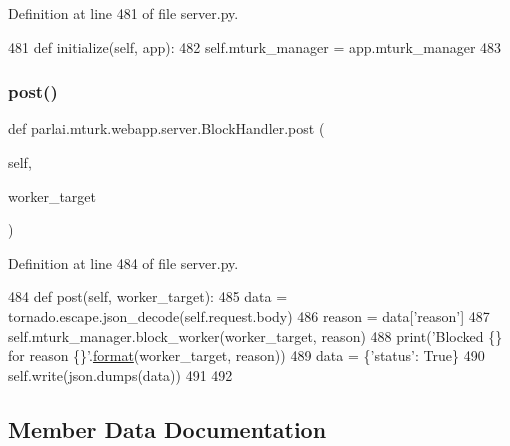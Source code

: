 Definition at line 481 of file server.\+py.


\begin{DoxyCode}
481     \textcolor{keyword}{def }initialize(self, app):
482         self.mturk\_manager = app.mturk\_manager
483 
\end{DoxyCode}
\mbox{\label{classparlai_1_1mturk_1_1webapp_1_1server_1_1BlockHandler_a8c9de27cced3819aaec3909b50d3b550}} 
\subsubsection{\texorpdfstring{post()}{post()}}
{\footnotesize\ttfamily def parlai.\+mturk.\+webapp.\+server.\+Block\+Handler.\+post (\begin{DoxyParamCaption}\item[{}]{self,  }\item[{}]{worker\+\_\+target }\end{DoxyParamCaption})}



Definition at line 484 of file server.\+py.


\begin{DoxyCode}
484     \textcolor{keyword}{def }post(self, worker\_target):
485         data = tornado.escape.json\_decode(self.request.body)
486         reason = data[\textcolor{stringliteral}{'reason'}]
487         self.mturk\_manager.block\_worker(worker\_target, reason)
488         print(\textcolor{stringliteral}{'Blocked \{\} for reason \{\}'}.\hyperlink{namespaceparlai_1_1chat__service_1_1services_1_1messenger_1_1shared__utils_a32e2e2022b824fbaf80c747160b52a76}{format}(worker\_target, reason))
489         data = \{\textcolor{stringliteral}{'status'}: \textcolor{keyword}{True}\}
490         self.write(json.dumps(data))
491 
492 
\end{DoxyCode}


\subsection{Member Data Documentation}
\mbox{\label{classparlai_1_1mturk_1_1webapp_1_1server_1_1BlockHandler_a478088460fbd6c910d6ca6bcb01b7016}} 
